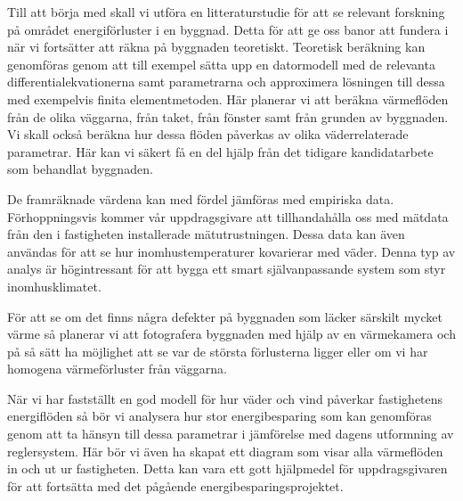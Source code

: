 Till att börja med skall vi utföra en litteraturstudie för att se relevant forskning på området energiförluster i en byggnad. Detta för att ge oss banor att fundera i när vi fortsätter att räkna på byggnaden teoretiskt. Teoretisk beräkning kan genomföras genom att till exempel sätta upp en datormodell med de relevanta differentialekvationerna samt parametrarna och approximera lösningen till dessa med exempelvis finita elementmetoden. Här planerar vi att beräkna värmeflöden från de olika väggarna, från taket, från fönster samt från grunden av byggnaden. Vi skall också beräkna hur dessa flöden påverkas av olika väderrelaterade parametrar. Här kan vi säkert få en del hjälp från det tidigare kandidatarbete som behandlat byggnaden.

De framräknade värdena kan med fördel jämföras med empiriska data. Förhoppningsvis kommer vår uppdragsgivare att tillhandahålla oss med mätdata från den i fastigheten installerade mätutrustningen. Dessa data kan även användas för att se hur inomhustemperaturer kovarierar med väder. Denna typ av analys är högintressant för att bygga ett smart självanpassande system som styr inomhusklimatet.

För att se om det finns några defekter på byggnaden som läcker särskilt mycket värme så planerar vi att fotografera byggnaden med hjälp av en värmekamera och på så sätt ha möjlighet att se var de största förlusterna ligger eller om vi har homogena värmeförluster från väggarna.

När vi har fastställt en god modell för hur väder och vind påverkar fastighetens energiflöden så bör vi analysera hur stor energibesparing som kan genomföras genom att ta hänsyn till dessa parametrar i jämförelse med dagens utformning av reglersystem. Här bör vi även ha skapat ett diagram som visar alla värmeflöden in och ut ur fastigheten. Detta kan vara ett gott hjälpmedel för uppdragsgivaren för att fortsätta med det pågående energibesparingsprojektet.